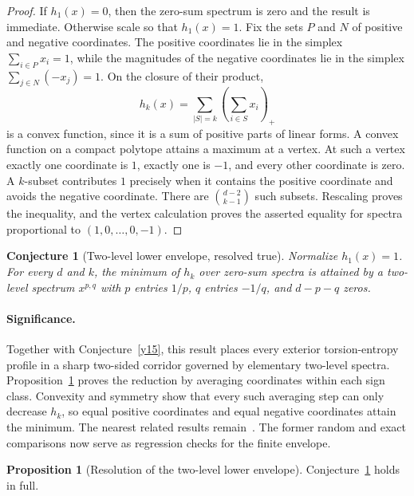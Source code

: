 \documentclass[11pt]{article}
\newtheorem{conjecture}{Conjecture}
\theoremstyle{definition}
\newtheorem{proposition}{Proposition}
\begin{document}
\begin{proof}
If $h_1(x)=0$, then the zero-sum spectrum is zero and the result is immediate.  Otherwise scale so that $h_1(x)=1$.  Fix the sets $P$ and $N$ of positive and negative coordinates.  The positive coordinates lie in the simplex $\sum_{i\in P}x_i=1$, while the magnitudes of the negative coordinates lie in the simplex $\sum_{j\in N}(-x_j)=1$.  On the closure of their product,
\[
h_k(x)=\sum_{|S|=k}\left(\sum_{i\in S}x_i\right)_+
\]
is a convex function, since it is a sum of positive parts of linear forms.  A convex function on a compact polytope attains a maximum at a vertex.  At such a vertex exactly one coordinate is $1$, exactly one is $-1$, and every other coordinate is zero.  A $k$-subset contributes $1$ precisely when it contains the positive coordinate and avoids the negative coordinate.  There are $\binom{d-2}{k-1}$ such subsets.  Rescaling proves the inequality, and the vertex calculation proves the asserted equality for spectra proportional to $(1,0,\ldots,0,-1)$.
\end{proof}

\begin{conjecture}[Two-level lower envelope, resolved true]\label{y16}
Normalize $h_1(x)=1$.  For every $d$ and $k$, the minimum of $h_k$ over zero-sum spectra is attained by a two-level spectrum $x^{p,q}$ with $p$ entries $1/p$, $q$ entries $-1/q$, and $d-p-q$ zeros.
\end{conjecture}

\paragraph{Significance.}
Together with Conjecture~\ref{y15}, this result places every exterior torsion-entropy profile in a sharp two-sided corridor governed by elementary two-level spectra.  Proposition~\ref{y:lower} proves the reduction by averaging coordinates within each sign class.  Convexity and symmetry show that every such averaging step can only decrease $h_k$, so equal positive coordinates and equal negative coordinates attain the minimum.  The nearest related results remain~\cite{BV13,BLP10}.  The former random and exact comparisons now serve as regression checks for the finite envelope.

\begin{proposition}[Resolution of the two-level lower envelope]\label{y:lower}
Conjecture~\ref{y16} holds in full.
\end{proposition}
\end{document}
